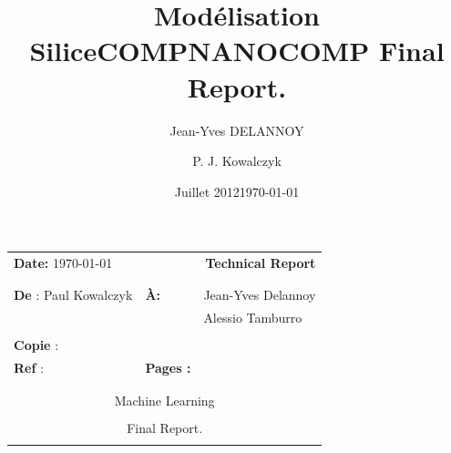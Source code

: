 \documentclass[10pt, letter]{report}
\title{Modélisation Silice}
\date{Juillet 2012}
\author{Jean-Yves DELANNOY}
\renewcommand{\=}{\, =\, }
\newcommand{\+}{\, +\, }
\renewcommand{\-}{\, -\, }
\begin{document}
\title{\textbf{COMPNANOCOMP Final Report.}}


\author{P. J. Kowalczyk}
\date{\today}

\vspace*{1cm}
\hspace*{-1cm}\begin{tabular}{p{}p{}p{}}
{\bf Date:} \today & \multicolumn{2}{r}{{\huge \bf{Technical Report }}}\\
\\
\hline
\\
{\bf De} : Paul Kowalczyk  & \bf{\`A:} & Jean-Yves Delannoy \\
&& Alessio Tamburro \\

 \\
{\bf Copie} :   \\
{\bf Ref} :&  {\bf Pages : }  & \pageref{LastPage} \\
\\
\hline
\\
\multicolumn{3}{c}{\LARGE Machine Learning} \\
\\
\multicolumn{3}{c}{\LARGE Final Report.} \\
\\
\hline
\end{tabular}
%
\vspace*{2cm}
\end{document}

